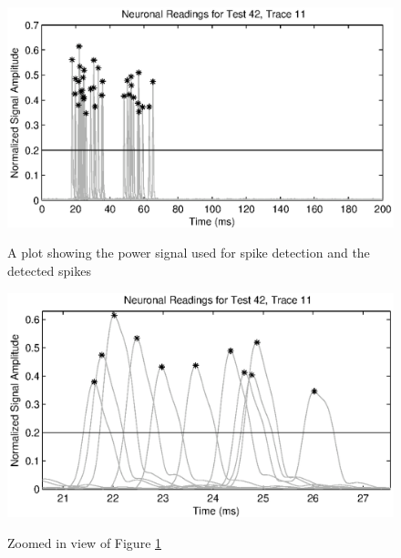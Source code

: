 \documentclass[11pt,letterpaper]{article}
\begin{document}
\begin{figure}
\begin{center}
  \includegraphics{SpikeDetect}\\
  \caption{A plot showing the power signal used for spike detection and the detected spikes}\label{SpikeDetect}
\end{center}
\end{figure}

\begin{figure}
\begin{center}
  \includegraphics{ZoomSpikeDetect}\\
  \caption{Zoomed in view of Figure \ref{SpikeDetect}}\label{ZoomSpikeDetect}
\end{center}
\end{figure}
\end{document}
